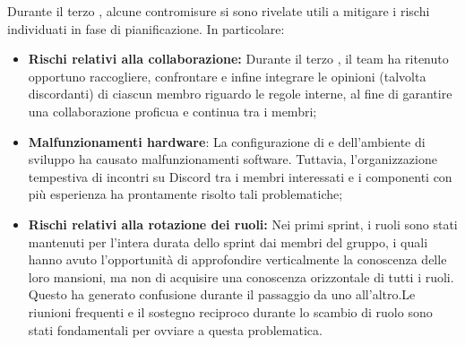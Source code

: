 \vspace{0.5\baselineskip}
\par Durante il terzo , alcune contromisure si sono rivelate utili a mitigare i rischi individuati in fase di pianificazione. In particolare:
\begin{itemize}
  \item \textbf{Rischi relativi alla collaborazione:} Durante il terzo , il team ha ritenuto opportuno raccogliere, confrontare e infine integrare le opinioni (talvolta discordanti) di ciascun membro riguardo le regole interne, al fine di garantire una collaborazione proficua e continua tra i membri;
  \item \textbf{Malfunzionamenti hardware}: La configurazione di  e dell'ambiente di sviluppo ha causato malfunzionamenti software. Tuttavia, l'organizzazione tempestiva di incontri su Discord tra i membri interessati e i componenti con più esperienza ha prontamente risolto tali problematiche;
  \item \textbf{Rischi relativi alla rotazione dei ruoli:} Nei primi sprint, i ruoli sono stati mantenuti per l'intera durata dello sprint dai membri del gruppo, i quali hanno avuto l'opportunità di approfondire verticalmente la conoscenza delle loro mansioni, ma non di acquisire una conoscenza orizzontale di tutti i ruoli. Questo ha generato confusione durante il passaggio da uno  all'altro.Le riunioni frequenti e il sostegno reciproco durante lo scambio di ruolo sono stati fondamentali per ovviare a questa problematica.
\end{itemize}
